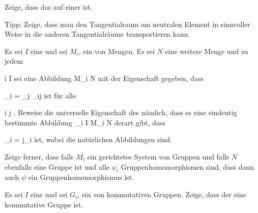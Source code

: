 {}
{





Zeige, dass das
auf einer
ist.





}
{} {Tipp: Zeige, dass man den Tangentialraum am neutralen Element in sinnvoller Weise in die anderen Tangentialräume transportieren kann.}

{}
{





Es sei $I$ eine
und sei $M_i$,
 ein
von Mengen. Es sei $N$ eine weitere Menge und zu jedem

\mavergleichskette
{\vergleichskette
{ i
}
{ \in }{ I
}
{  }{
}
{    }{
}
{   }{
}
}
{}{}{}
sei eine Abbildung
 { M_i } { N
} {}
mit der Eigenschaft gegeben, dass

\mavergleichskette
{\vergleichskette
{ \psi_i
}
{ = }{ \psi_j \circ \varphi_{ij}
}
{  }{
}
{    }{
}
{   }{
}
}
{}{}{}
ist für alle

\mavergleichskette
{\vergleichskette
{ i
}
{ \preccurlyeq }{ j
}
{  }{
}
{    }{
}
{   }{
}
}
{}{}{}
 {} {.}
Beweise die universelle Eigenschaft des
nämlich, dass es eine eindeutig bestimmte Abbildung
\maabbdisp {\psi} { \,_{i \in I} M_i  } { N
} {}
derart gibt, dass

\mavergleichskette
{\vergleichskette
{ \psi_i
}
{ = }{ \psi  \circ j_i
}
{  }{
}
{    }{
}
{   }{
}
}
{}{}{}
ist, wobei
 die natürlichen Abbildungen sind.

Zeige ferner, dass falls $M_i$ ein gerichtetes System von Gruppen und falls $N$ ebenfalls eine Gruppe ist und alle $\psi_i$ Gruppenhomomorphismen sind, dass dann auch $\psi$ ein Gruppenhomomorphismus ist.





}
{} {}

{}
{





Es sei $I$ eine
und sei $G_i$,
 ein
von kommutativen Gruppen. Zeige, dass der
eine kommutative Gruppe ist.





}
{} {}

